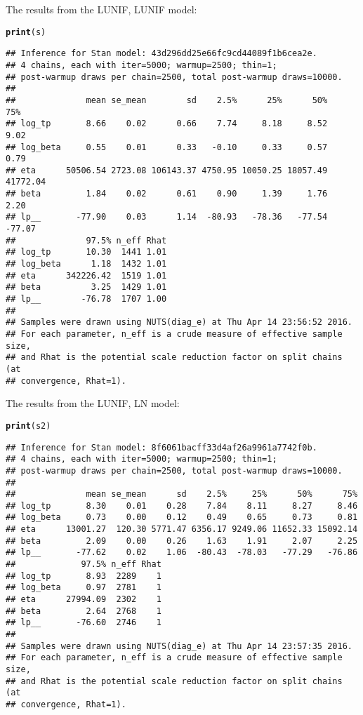 \documentclass{scrartcl}\usepackage[]{graphicx}\usepackage[]{color}
\makeatletter
\newcommand{\hlstd}[1]{\textcolor[rgb]{0.345,0.345,0.345}{#1}}%
\newcommand{\hlkwd}[1]{\textcolor[rgb]{0.737,0.353,0.396}{\textbf{#1}}}%
\newenvironment{kframe}{%
 \def\at@end@of@kframe{}%
 \ifinner\ifhmode%
  \def\at@end@of@kframe{\end{minipage}}%
  \begin{minipage}{\columnwidth}%
 \fi\fi%
 \def\FrameCommand##1{\hskip\@totalleftmargin \hskip-\fboxsep
 \colorbox{shadecolor}{##1}\hskip-\fboxsep
     \hskip-\linewidth \hskip-\@totalleftmargin \hskip\columnwidth}%
 \MakeFramed {\advance\hsize-\width
   \@totalleftmargin\z@ \linewidth\hsize
   \@setminipage}}%
 {\par\unskip\endMakeFramed%
 \at@end@of@kframe}
\newenvironment{knitrout}{}{} %
\makeatother
\begin{document}
\begin{enumerate}
The results from the LUNIF, LUNIF model:
\begin{knitrout}
\color{fgcolor}\begin{kframe}
\begin{alltt}
\hlkwd{print}\hlstd{(s)}
\end{alltt}
\begin{verbatim}
## Inference for Stan model: 43d296dd25e66fc9cd44089f1b6cea2e.
## 4 chains, each with iter=5000; warmup=2500; thin=1; 
## post-warmup draws per chain=2500, total post-warmup draws=10000.
## 
##              mean se_mean        sd    2.5%      25%      50%      75%
## log_tp       8.66    0.02      0.66    7.74     8.18     8.52     9.02
## log_beta     0.55    0.01      0.33   -0.10     0.33     0.57     0.79
## eta      50506.54 2723.08 106143.37 4750.95 10050.25 18057.49 41772.04
## beta         1.84    0.02      0.61    0.90     1.39     1.76     2.20
## lp__       -77.90    0.03      1.14  -80.93   -78.36   -77.54   -77.07
##              97.5% n_eff Rhat
## log_tp       10.30  1441 1.01
## log_beta      1.18  1432 1.01
## eta      342226.42  1519 1.01
## beta          3.25  1429 1.01
## lp__        -76.78  1707 1.00
## 
## Samples were drawn using NUTS(diag_e) at Thu Apr 14 23:56:52 2016.
## For each parameter, n_eff is a crude measure of effective sample size,
## and Rhat is the potential scale reduction factor on split chains (at 
## convergence, Rhat=1).
\end{verbatim}
\end{kframe}
\end{knitrout}

The results from the LUNIF, LN model:
\begin{knitrout}
\color{fgcolor}\begin{kframe}
\begin{alltt}
\hlkwd{print}\hlstd{(s2)}
\end{alltt}
\begin{verbatim}
## Inference for Stan model: 8f6061bacff33d4af26a9961a7742f0b.
## 4 chains, each with iter=5000; warmup=2500; thin=1; 
## post-warmup draws per chain=2500, total post-warmup draws=10000.
## 
##              mean se_mean      sd    2.5%     25%      50%      75%
## log_tp       8.30    0.01    0.28    7.84    8.11     8.27     8.46
## log_beta     0.73    0.00    0.12    0.49    0.65     0.73     0.81
## eta      13001.27  120.30 5771.47 6356.17 9249.06 11652.33 15092.14
## beta         2.09    0.00    0.26    1.63    1.91     2.07     2.25
## lp__       -77.62    0.02    1.06  -80.43  -78.03   -77.29   -76.86
##             97.5% n_eff Rhat
## log_tp       8.93  2289    1
## log_beta     0.97  2781    1
## eta      27994.09  2302    1
## beta         2.64  2768    1
## lp__       -76.60  2746    1
## 
## Samples were drawn using NUTS(diag_e) at Thu Apr 14 23:57:35 2016.
## For each parameter, n_eff is a crude measure of effective sample size,
## and Rhat is the potential scale reduction factor on split chains (at 
## convergence, Rhat=1).
\end{verbatim}
\end{kframe}
\end{knitrout}


\end{enumerate}
\end{document}
